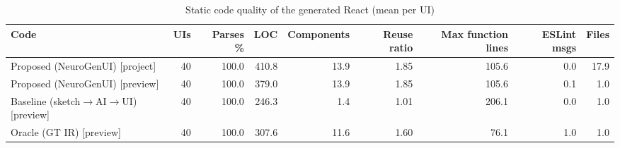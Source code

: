 \begin{table}[t]
\centering
\scriptsize
\caption{Static code quality of the generated React (mean per UI)}
\label{tab:code}
\setlength{\tabcolsep}{3.5pt}
\begin{adjustbox}{max width=\textwidth}
\begin{tabular}{lrrrrrrrr}
\toprule
\textbf{Code} & \textbf{UIs} & \textbf{Parses \%} & \textbf{LOC} & \textbf{Components} & \textbf{Reuse ratio} & \textbf{Max function lines} & \textbf{ESLint msgs} & \textbf{Files} \\
\midrule
Proposed (NeuroGenUI) [project] & 40 & 100.0 & 410.8 & 13.9 & 1.85 & 105.6 & 0.0 & 17.9 \\
Proposed (NeuroGenUI) [preview] & 40 & 100.0 & 379.0 & 13.9 & 1.85 & 105.6 & 0.1 & 1.0 \\
Baseline (sketch$\rightarrow$AI$\rightarrow$UI) [preview] & 40 & 100.0 & 246.3 & 1.4 & 1.01 & 206.1 & 0.0 & 1.0 \\
Oracle (GT IR) [preview] & 40 & 100.0 & 307.6 & 11.6 & 1.60 & 76.1 & 1.0 & 1.0 \\
\bottomrule
\end{tabular}
\end{adjustbox}
\end{table}
